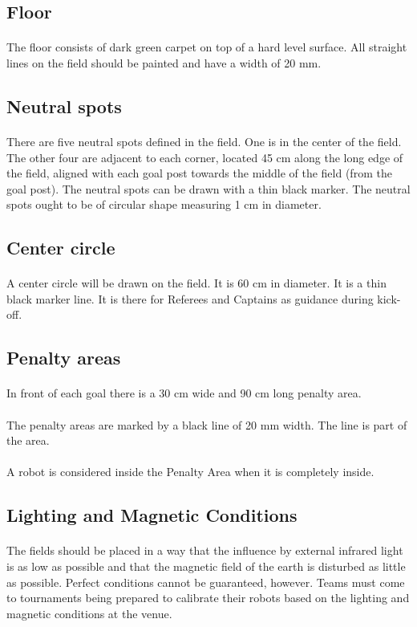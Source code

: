 \documentclass{article}
\newcommand*{\p}{\paragraph{}}
\begin{document}
\subsection{ Floor \label{ref-033}}

\p The floor consists of dark green carpet on top of a hard level surface.  All
straight lines on the field should be painted and have a width of 20 mm.

\subsection{ Neutral spots \label{ref-034}}

\p There are five neutral spots defined in the field. One is in the center of the
field. The other four are adjacent to each corner, located 45 cm along the long
edge of the field, aligned with each goal post towards the middle of the field
(from the goal post). The neutral spots can be drawn with a thin black marker.
The neutral spots ought to be of circular shape measuring 1 cm in diameter.

\subsection{ Center circle \label{ref-035}}

\p A center circle will be drawn on the field. It is 60 cm in diameter. It is a
thin black marker line. It is there for Referees and Captains as guidance
during kick-off.

\subsection{ Penalty areas \label{ref-036}}

\p In front of each goal there is a 30 cm wide and 90 cm long penalty area.

\p The penalty areas are marked by a black line of 20 mm width. The line is part
of the area.

\p A robot is considered inside the Penalty Area when it is completely inside.

\subsection{Lighting and Magnetic Conditions \label{ref-lighting-conditions}}

\p The fields should be placed in a way that the influence by external infrared
light is as low as possible and that the magnetic field of the earth is
disturbed as little as possible. Perfect conditions cannot be guaranteed,
however. Teams must come to tournaments being prepared to calibrate their
robots based on the lighting and magnetic conditions at the venue.
\end{document}
